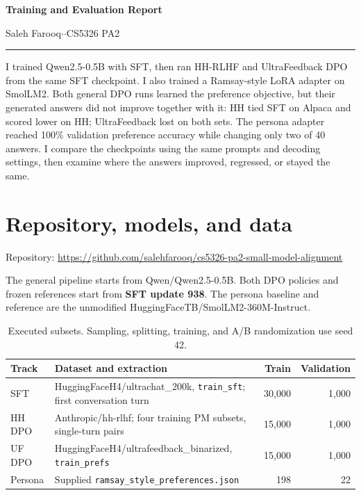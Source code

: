 \documentclass[11pt,a4paper]{article}
\newcommand{\model}[1]{\textsf{#1}}
\begin{document}
\thispagestyle{fancy}
{\LARGE\bfseries\color{navy}Training and Evaluation Report}\par
\vspace{4pt}
Saleh Farooq\enspace $\cdot$\enspace $\cdot$\enspace CS5326 PA2
\vspace{6pt}\hrule\vspace{7pt}
I trained Qwen2.5-0.5B with SFT, then ran HH-RLHF and UltraFeedback DPO from the same SFT checkpoint. I also trained a Ramsay-style LoRA adapter on SmolLM2. Both general DPO runs learned the preference objective, but their generated answers did not improve together with it: HH tied SFT on Alpaca and scored lower on HH; UltraFeedback lost on both sets. The persona adapter reached 100\% validation preference accuracy while changing only two of 40 answers. I compare the checkpoints using the same prompts and decoding settings, then examine where the answers improved, regressed, or stayed the same.

\section{Repository, models, and data}
Repository: {\small\url{https://github.com/salehfarooq/cs5326-pa2-small-model-alignment}}\par
The general pipeline starts from \model{Qwen/Qwen2.5-0.5B}. Both DPO policies and frozen references start from \textbf{SFT update 938}. The persona baseline and reference are the unmodified \model{HuggingFaceTB/SmolLM2-360M-Instruct}.

\begin{table}[H]
\centering\small
\begin{tabularx}{\linewidth}{@{}lYrr@{}}\toprule
Track & Dataset and extraction & Train & Validation\\\midrule
SFT & \model{HuggingFaceH4/ultrachat\_200k}, \texttt{train\_sft}; first conversation turn & 30,000 & 1,000\\
HH DPO & \model{Anthropic/hh-rlhf}; four training PM subsets, single-turn pairs & 15,000 & 1,000\\
UF DPO & \model{HuggingFaceH4/ultrafeedback\_binarized}, \texttt{train\_prefs} & 15,000 & 1,000\\
Persona & Supplied \texttt{ramsay\_style\_preferences.json} & 198 & 22\\\bottomrule
\end{tabularx}
\caption{Executed subsets. Sampling, splitting, training, and A/B randomization use seed 42.}
\end{table}
\end{document}

